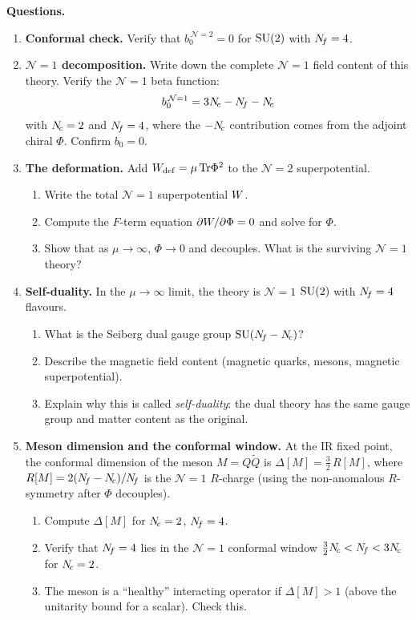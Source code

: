 \documentclass[11pt,a4paper]{article}
\begin{document}
\noindent\textbf{Questions.}
\begin{enumerate}[label=(\alph*)]
  \item \textbf{Conformal check.}  Verify that
    $b_0^{\,\mathcal{N}=2} = 0$ for $\mathrm{SU}(2)$ with $N_{\!f} = 4$.

  \item \textbf{$\mathcal{N}=1$ decomposition.}  Write down the
    complete $\mathcal{N}=1$ field content of this theory.  Verify the
    $\mathcal{N}=1$ beta function:
    \[
      b_0^{\,\mathcal{N}=1} = 3N_{\!c} - N_{\!f} - N_{\!c}
    \]
    with $N_{\!c} = 2$ and $N_{\!f} = 4$, where the $-N_{\!c}$ contribution comes
    from the adjoint chiral $\Phi$.  Confirm $b_0 = 0$.

  \item \textbf{The deformation.}  Add $W_{\mathrm{def}} =
    \mu\,\mathrm{Tr}\Phi^2$ to the $\mathcal{N}=2$ superpotential.
    \begin{enumerate}[label=(\roman*)]
      \item Write the total $\mathcal{N}=1$ superpotential $W$.
      \item Compute the $F$-term equation $\partial W/\partial\Phi =
        0$ and solve for $\Phi$.
      \item Show that as $\mu \to \infty$, $\Phi \to 0$ and decouples.
        What is the surviving $\mathcal{N}=1$ theory?
    \end{enumerate}

  \item \textbf{Self-duality.}  In the $\mu \to \infty$ limit, the
    theory is $\mathcal{N}=1$ $\mathrm{SU}(2)$ with $N_{\!f} = 4$ flavours.
    \begin{enumerate}[label=(\roman*)]
      \item What is the Seiberg dual gauge group
        $\mathrm{SU}(N_{\!f} - N_{\!c})$?
      \item Describe the magnetic field content (magnetic quarks, mesons,
        magnetic superpotential).
      \item Explain why this is called \emph{self-duality}: the dual
        theory has the same gauge group and matter content as the
        original.
    \end{enumerate}

  \item \textbf{Meson dimension and the conformal window.}  At the IR
    fixed point, the conformal dimension of the meson $M = Q\widetilde{Q}$
    is $\Delta[M] = \tfrac{3}{2}\,R[M]$, where $R[M] = 2(N_{\!f} - N_{\!c})/N_{\!f}$
    is the $\mathcal{N}=1$ $R$-charge (using the non-anomalous
    $R$-symmetry after $\Phi$ decouples).
    \begin{enumerate}[label=(\roman*)]
      \item Compute $\Delta[M]$ for $N_{\!c} = 2$, $N_{\!f} = 4$.
      \item Verify that $N_{\!f} = 4$ lies in the $\mathcal{N}=1$ conformal
        window $\frac{3}{2}N_{\!c} < N_{\!f} < 3N_{\!c}$ for $N_{\!c} = 2$.
      \item The meson is a ``healthy'' interacting operator
        if $\Delta[M] > 1$ (above the unitarity bound for a scalar).
        Check this.
    \end{enumerate}


\end{enumerate}
\end{document}
